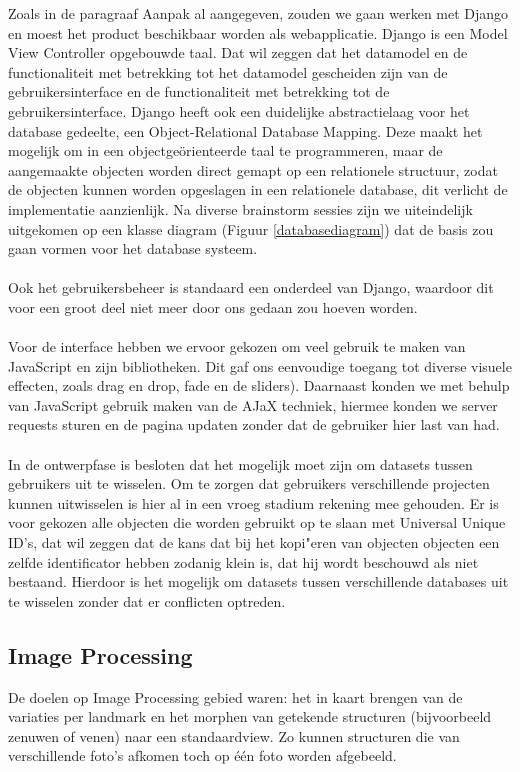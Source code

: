 Zoals in de paragraaf Aanpak al aangegeven, zouden we gaan werken met Django en moest het product beschikbaar worden als webapplicatie. Django is een Model View Controller opgebouwde taal. Dat wil zeggen dat het datamodel en de functionaliteit met betrekking tot het datamodel gescheiden zijn van de gebruikersinterface en de functionaliteit met betrekking tot de gebruikersinterface. Django heeft ook een duidelijke abstractielaag voor het database gedeelte, een Object-Relational Database Mapping. Deze maakt het mogelijk om in een object\-ge\"{o}rienteerde taal te programmeren, maar de aangemaakte objecten worden direct gemapt op een relationele structuur, zodat de objecten kunnen worden opgeslagen in een relationele database, dit verlicht de implementatie aanzienlijk. Na diverse brainstorm sessies zijn we uiteindelijk uitgekomen op een klasse diagram (Figuur \ref{databasediagram}) dat de basis zou gaan vormen voor het database systeem.
\\
\\
Ook het gebruikers\-beheer is standaard een onderdeel van Django, waardoor dit voor een groot deel niet meer door ons gedaan zou hoeven worden.
\\
\\
Voor de interface hebben we ervoor gekozen om veel gebruik te maken van JavaScript en zijn bibliotheken. Dit gaf ons eenvoudige toegang tot diverse visuele effecten, zoals drag en drop, fade en de sliders). Daarnaast konden we met behulp van JavaScript gebruik maken van de AJaX techniek, hiermee konden we server requests sturen en de pagina updaten zonder dat de gebruiker hier last van had.
\\
\\
In de ontwerpfase is besloten dat het mogelijk moet zijn om datasets tussen gebruikers uit te wisselen. Om te zorgen dat gebruikers verschillende projecten kunnen uitwisselen is hier al in een vroeg stadium rekening mee gehouden. Er is voor gekozen alle objecten die worden gebruikt op te slaan met Universal Unique ID's, dat wil zeggen dat de kans dat bij het kopi"{e}ren van objecten objecten een zelfde identificator hebben zodanig klein is, dat hij wordt beschouwd als niet bestaand. Hierdoor is het mogelijk om datasets tussen verschillende databases uit te wisselen zonder dat er conflicten optreden.

\subsection{Image Processing}
\label{aanpak_image_processing}
De doelen op Image Processing gebied waren: het in kaart brengen van de variaties per landmark en het morphen van getekende structuren (bijvoorbeeld zenuwen of venen) naar een standaardview. Zo kunnen structuren die van verschillende foto's afkomen toch op \'{e}\'{e}n foto worden afgebeeld.

